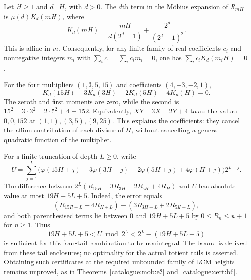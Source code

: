\begin{prop}\label{catalogue:mob:e3}
Let $H\ge1$ and $d\mid H$, with $d>0$. The $d$th term in the
M\"obius expansion of $R_{mH}$ is $\mu(d)K_d(mH)$, where
\[
 K_d(mH)=\frac{mH}{d(2^d-1)}+\frac{2^d}{(2^d-1)^2}.
\]
This is affine in $m$. Consequently, for any finite family of real
coefficients $c_i$ and nonnegative integers $m_i$ with
$\sum_i c_i=\sum_i c_i m_i=0$, one has
$\sum_i c_i K_d(m_iH)=0$.

For the four multipliers $(1,3,5,15)$ and coefficients $(4,-3,-2,1)$,
\[
 K_d(15H)-3K_d(3H)-2K_d(5H)+4K_d(H)=0.
\]
The zeroth and first moments are zero, while the second is
$15^2-3\cdot3^2-2\cdot5^2+4=152$.
Equivalently, $XY-3X-2Y+4$ takes the values $0,0,152$ at
$(1,1),(3,5),(9,25)$. This explains the coefficients: they cancel the
affine contribution of each divisor of $H$, without cancelling a general
quadratic function of the multiplier.

For a finite truncation of depth $L\ge0$, write
\[
 U=\sum_{j=1}^{L}
 \bigl(\varphi(15H+j)-3\varphi(3H+j)
       -2\varphi(5H+j)+4\varphi(H+j)\bigr)2^{L-j}.
\]
The difference between $2^L(R_{15H}-3R_{3H}-2R_{5H}+4R_H)$ and $U$
has absolute value at most $19H+5L+5$. Indeed, the error equals
\[
 (R_{15H+L}+4R_{H+L})-(3R_{3H+L}+2R_{5H+L}),
\]
and both parenthesised terms lie between $0$ and $19H+5L+5$ by
$0\le R_n\le n+1$ for $n\ge1$.
Thus
\[
 19H+5L+5<U\bmod2^L<2^L-(19H+5L+5)
\]
is sufficient for this four-tail combination to be nonintegral.
The bound is derived from these tail enclosures; no optimality for the
actual totient tails is asserted. Obtaining such certificates at the
required unbounded family of LCM heights remains unproved, as in
Theorems~\ref{catalogue:mob:e2} and~\ref{catalogue:cert:b6}.
\end{prop}

